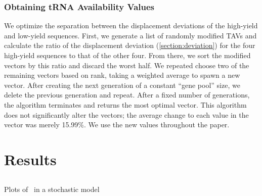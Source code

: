 \documentclass[12pt]{article}
\begin{document}
\subsubsection{Obtaining tRNA Availability Values}
We optimize the separation between the displacement deviations of the 
high-yield and low-yield sequences. First, we generate a list of 
randomly modified TAVs and calculate the ratio of the 
displacement deviation (\autoref{section:deviation}) for the four 
high-yield sequences to that of the other four. From there, we sort the 
modified vectors by this ratio and discard the worst half.
We repeated choose two of the remaining vectors based on rank, taking a weighted 
average to spawn a new vector.  After creating the 
next generation of a constant ``gene pool'' size, we delete 
the previous generation and repeat. After a fixed number of 
generations, the algorithm terminates and returns the most optimal vector.
This algorithm does not significantly alter the vectors; the average 
change to each value in the vector was merely 15.99\%. We use the new values
throughout the paper.

\section{Results}
\subsection{\prfB}

\begin{cfigure}
  \caption{Plots of \prfB\ in a stochastic model}
  \label{prfB:stochplots}
\end{cfigure}
\end{document}
